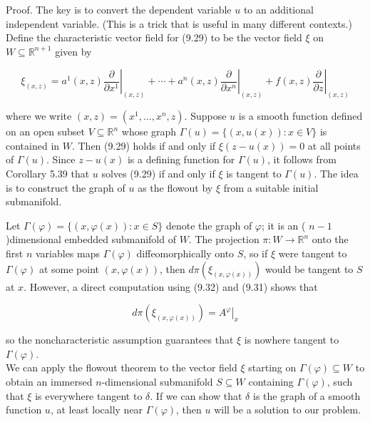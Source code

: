 \documentclass[10pt]{article}
\begin{document}
Proof. The key is to convert the dependent variable $u$ to an additional independent variable. (This is a trick that is useful in many different contexts.) Define the characteristic vector field for (9.29) to be the vector field $\xi$ on $W \subseteq \mathbb{R}^{n+1}$ given by

$$
\xi_{(x, z)}=\left.a^{1}(x, z) \frac{\partial}{\partial x^{1}}\right|_{(x, z)}+\cdots+\left.a^{n}(x, z) \frac{\partial}{\partial x^{n}}\right|_{(x, z)}+\left.f(x, z) \frac{\partial}{\partial z}\right|_{(x, z)}
$$

where we write $(x, z)=\left(x^{1}, \ldots, x^{n}, z\right)$. Suppose $u$ is a smooth function defined on an open subset $V \subseteq \mathbb{R}^{n}$ whose graph $\Gamma(u)=\{(x, u(x)): x \in V\}$ is contained in $W$. Then (9.29) holds if and only if $\xi(z-u(x))=0$ at all points of $\Gamma(u)$. Since $z-u(x)$ is a defining function for $\Gamma(u)$, it follows from Corollary 5.39 that $u$ solves (9.29) if and only if $\xi$ is tangent to $\Gamma(u)$. The idea is to construct the graph of $u$ as the flowout by $\xi$ from a suitable initial submanifold.

Let $\Gamma(\varphi)=\{(x, \varphi(x)): x \in S\}$ denote the graph of $\varphi$; it is an ( $n-1$ )dimensional embedded submanifold of $W$. The projection $\pi: W \rightarrow \mathbb{R}^{n}$ onto the first $n$ variables maps $\Gamma(\varphi)$ diffeomorphically onto $S$, so if $\xi$ were tangent to $\Gamma(\varphi)$ at some point $(x, \varphi(x))$, then $d \pi\left(\xi_{(x, \varphi(x))}\right)$ would be tangent to $S$ at $x$. However, a direct computation using (9.32) and (9.31) shows that

$$
d \pi\left(\xi_{(x, \varphi(x))}\right)=\left.A^{\varphi}\right|_{x}
$$

so the noncharacteristic assumption guarantees that $\xi$ is nowhere tangent to $\Gamma(\varphi)$.\\
We can apply the flowout theorem to the vector field $\xi$ starting on $\Gamma(\varphi) \subseteq W$ to obtain an immersed $n$-dimensional submanifold $S \subseteq W$ containing $\Gamma(\varphi)$, such that $\xi$ is everywhere tangent to $\delta$. If we can show that $\delta$ is the graph of a smooth function $u$, at least locally near $\Gamma(\varphi)$, then $u$ will be a solution to our problem.
\end{document}
